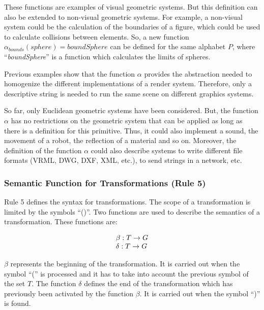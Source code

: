 \documentclass[10pt,journal,letterpaper,compsoc]{IEEEtran}
\begin{document}
These functions are examples of visual geometric systems. But this definition can also be extended
to non-visual geometric systems. For example, a non-visual system could be the calculation of the
boundaries of a figure, which could be used to calculate collisions between elements. So, a new
function $\alpha_{bounds}(sphere) = boundSphere$ can be defined for the same alphabet $P$, where
``\textit{boundSphere}'' is a function which calculates the limits of spheres.

Previous examples show that the function $\alpha$ provides the
abstraction needed to homogenize the different implementations of a render
system. Therefore, only a descriptive string is needed to run the same scene on
different graphics systems.

So far, only Euclidean geometric systems have been considered. But, the function $\alpha$ has no
restrictions on the geometric system that can be applied as long as there is a definition for this
primitive. Thus, it could also implement a sound, the movement of a robot, the reflection of a
material and so on. Moreover, the definition of the function $\alpha$ could also describe systems
to write different file formats (VRML, DWG, DXF, XML, etc.), to send strings in a network, etc.




\subsubsection{Semantic Function for Transformations (Rule 5)
\label{sec:rule5}}

Rule 5 defines the syntax for transformations. The scope of a transformation is
limited by the symbols ``()''. Two functions are used to describe the semantics
of a transformation. These functions are:

\begin{equation}
\begin{tabular}{l}
    $\beta: T \rightarrow G$ \\
    $\delta: T \rightarrow G$
\end{tabular}
\end{equation}


$\beta$ represents the beginning of the transformation. It is carried out when the symbol ``('' is
processed and it has to take into account the previous symbol of the set $T$. The function $\delta$
defines the end of the transformation which has previously been activated by the function $\beta$.
It is carried out when the symbol ``)'' is found.
\end{document}
